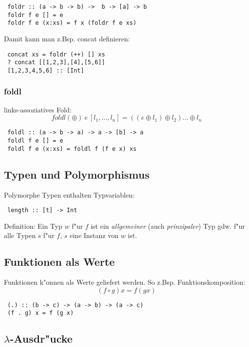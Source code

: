 \documentclass[german,10pt, a4paper, twocolumn]{scrartcl}
\theoremstyle{definition}
\theoremstyle{remark}
\begin{document}
\begin{verbatim}
 foldr :: (a -> b -> b) ->  b -> [a] -> b
 foldr f e [] = e
 foldr f e (x:xs) = f x (foldr f e xs)
\end{verbatim}

Damit kann man z.Bsp. concat definieren:
\begin{verbatim}
 concat xs = foldr (++) [] xs
 ? concat [[1,2,3],[4],[5,6]]
 [1,2,3,4,5,6] :: [Int]
\end{verbatim}

\subsubsection{foldl}

links-assoziatives Fold:
\begin{displaymath}
	foldl (\oplus)\ e\ [l_1,\ldots,l_n] = ((e\oplus l_1)\oplus l_2)\ldots\oplus l_n
\end{displaymath}

\begin{verbatim}
 foldl :: (a -> b -> a) -> a -> [b] -> a
 foldl f e [] = e
 foldl f e (x:xs) = foldl f (f e x) xs
\end{verbatim}

\subsection{Typen und Polymorphismus}

Polymorphe Typen enthalten Typvariablen:
\begin{verbatim}
 length :: [t] -> Int
\end{verbatim}

Definition: Ein Typ $w$ f"ur $f$ ist ein \textit{allgemeiner} (auch \textit{prinzipaler}) Typ gdw. f"ur alle Typen $s$ f"ur $f$, $s$ eine Instanz von $w$ ist.

\subsection{Funktionen als Werte}

Funktionen k"onnen als Werte geliefert werden. So z.Bsp. Funktionskomposition:
\begin{displaymath}
	(f\circ g) x = f(g x)
\end{displaymath}
\begin{verbatim}
 (.) :: (b -> c) -> (a -> b) -> (a -> c)
 (f . g) x = f (g x)
\end{verbatim}

\subsection{$\lambda$-Ausdr"ucke}
\end{document}
